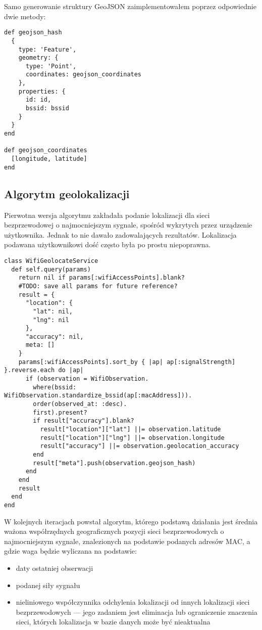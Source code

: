 Samo generowanie struktury GeoJSON zaimplementowałem poprzez odpowiednie dwie metody:

\begin{verbatim}
def geojson_hash
  {
    type: 'Feature',
    geometry: {
      type: 'Point',
      coordinates: geojson_coordinates
    },
    properties: {
      id: id,
      bssid: bssid
    }
  }
end

def geojson_coordinates
  [longitude, latitude]
end
\end{verbatim}

\subsection{Algorytm geolokalizacji}

Pierwotna wersja algorytmu zakładała podanie lokalizacji dla sieci bezprzewodowej o najmocniejszym sygnale, spośród wykrytych przez urządzenie użytkownika. Jednak to nie dawało zadowalających rezultatów. Lokalizacja podawana użytkownikowi dość często była po prostu niepoprawna.

\begin{verbatim}
class WifiGeolocateService
  def self.query(params)
    return nil if params[:wifiAccessPoints].blank?
    #TODO: save all params for future reference?
    result = {
      "location": {
        "lat": nil,
        "lng": nil
      },
      "accuracy": nil,
      meta: []
    }
    params[:wifiAccessPoints].sort_by { |ap| ap[:signalStrength] }.reverse.each do |ap|
      if (observation = WifiObservation.
        where(bssid: WifiObservation.standardize_bssid(ap[:macAddress])).
        order(observed_at: :desc).
        first).present?
        if result["accuracy"].blank?
          result["location"]["lat"] ||= observation.latitude
          result["location"]["lng"] ||= observation.longitude
          result["accuracy"] ||= observation.geolocation_accuracy
        end
        result["meta"].push(observation.geojson_hash)
      end
    end
    result
  end
end
\end{verbatim}

W kolejnych iteracjach powstał algorytm, którego podstawą działania jest średnia ważona współrzędnych geograficznych pozycji sieci bezprzewodowych o najmocniejszym sygnale, znalezionych na podstawie podanych adresów MAC, a gdzie waga będzie wyliczana na podstawie:

\begin{itemize}
\item daty ostatniej obserwacji
\item podanej siły sygnału
\item nieliniowego współczynnika odchylenia lokalizacji od innych lokalizacji sieci bezprzewodowych — jego zadaniem jest eliminacja lub ograniczenie znaczenia sieci, których lokalizacja w bazie danych może być nieaktualna
\end{itemize}

